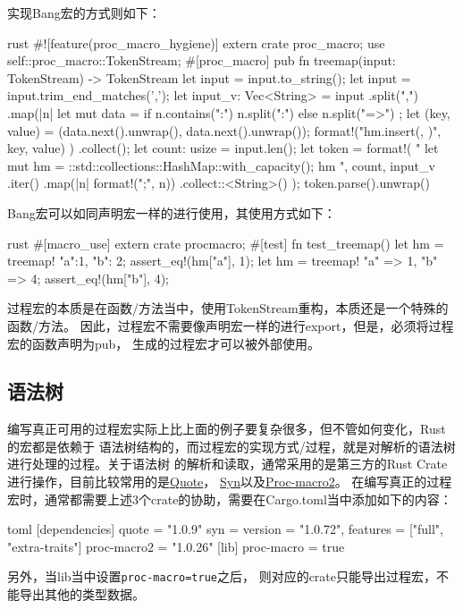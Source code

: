 实现Bang宏的方式则如下：
\begin{code-block}{rust}
#![feature(proc_macro_hygiene)]
extern crate proc_macro;
use self::proc_macro::TokenStream;
#[proc_macro]
pub fn treemap(input: TokenStream) -> TokenStream {
    let input = input.to_string();
    let input = input.trim_end_matches(',');
    let input_v: Vec<String> = input
        .split(",")
        .map(|n| {
            let mut data = if n.contains(":") {
                n.split(":")
            } else {
                n.split("=>")
            };
            let (key, value) = (data.next().unwrap(), data.next().unwrap());
            format!("hm.insert({}, {})", key, value)
        })
        .collect();
    let count: usize = input.len();
    let token = format!(
        "{{
        let mut hm = ::std::collections::HashMap::with_capacity({});
        {}
        hm
    }}",
        count,
        input_v
            .iter()
            .map(|n| format!("{};", n))
            .collect::<String>()
    );
    token.parse().unwrap()
}
\end{code-block}

Bang宏可以如同声明宏一样的进行使用，其使用方式如下：
\begin{code-block}{rust}
#[macro_use]
extern crate procmacro;
#[test]
fn test_treemap() {
    let hm = treemap! {"a":1, "b": 2};
    assert_eq!(hm["a"], 1);
    let hm = treemap! {"a" => 1, "b" => 4};
    assert_eq!(hm["b"], 4);
}
\end{code-block}

过程宏的本质是在函数/方法当中，使用TokenStream重构，本质还是一个特殊的函数/方法。
因此，过程宏不需要像声明宏一样的进行export，但是，必须将过程宏的函数声明为pub，
生成的过程宏才可以被外部使用。

\subsection{语法树}
编写真正可用的过程宏实际上比上面的例子要复杂很多，但不管如何变化，Rust的宏都是依赖于
语法树结构的，而过程宏的实现方式/过程，就是对解析的语法树进行处理的过程。关于语法树
的解析和读取，通常采用的是第三方的Rust Crate进行操作，目前比较常用的是\href{https://github.com/dtolnay/quote}{Quote}，
\href{https://github.com/dtolnay/syn}{Syn}以及\href{https://github.com/alexcrichton/proc-macro2}{Proc-macro2}。
在编写真正的过程宏时，通常都需要上述3个crate的协助，需要在Cargo.toml当中添加如下的内容：
\begin{code-block}{toml}
[dependencies]
quote = "1.0.9"
syn = {version = "1.0.72", features = ["full", "extra-traits"]}
proc-macro2 = "1.0.26"
[lib]
proc-macro = true
\end{code-block}
另外，当lib当中设置\texttt{proc-macro=true}之后，
则对应的crate只能导出过程宏，不能导出其他的类型数据。

